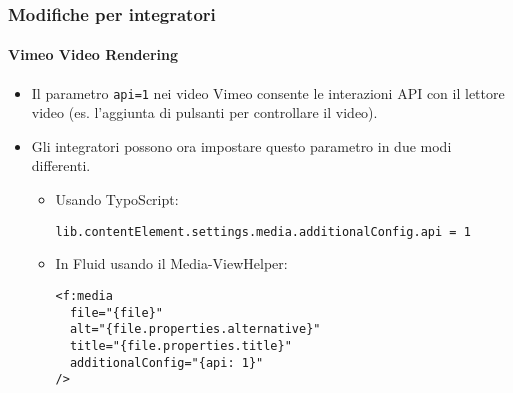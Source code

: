 
\begin{frame}[fragile]
	\frametitle{Modifiche per integratori}
	\framesubtitle{Vimeo Video Rendering}

	\lstset{basicstyle=\smaller\ttfamily}

	\begin{itemize}
		\item Il parametro \texttt{api=1} nei video Vimeo consente le interazioni API con il lettore video (es. l'aggiunta di pulsanti per controllare il video).
		\item Gli integratori possono ora impostare questo parametro in due modi differenti.

		\begin{itemize}
			\item Usando TypoScript:

\begin{lstlisting}
lib.contentElement.settings.media.additionalConfig.api = 1
\end{lstlisting}

			\item In Fluid usando il Media-ViewHelper:

\begin{lstlisting}
<f:media
  file="{file}"
  alt="{file.properties.alternative}"
  title="{file.properties.title}"
  additionalConfig="{api: 1}"
/>
\end{lstlisting}

		\end{itemize}
	\end{itemize}

\end{frame}


